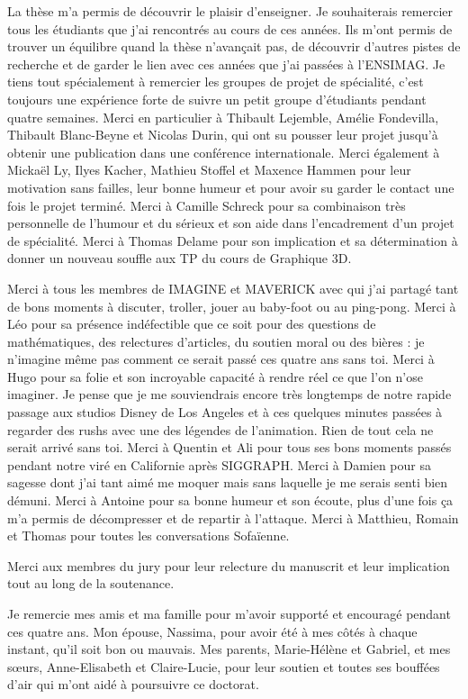 La thèse m'a permis de découvrir le plaisir d'enseigner. Je souhaiterais remercier tous les étudiants que j'ai rencontrés au cours de ces années.
Ils m'ont permis de trouver un équilibre quand la thèse n’avançait pas, de découvrir d'autres pistes de recherche et de garder le lien avec ces années que j'ai passées à l'ENSIMAG. Je tiens tout spécialement à remercier les groupes de projet de spécialité, c'est toujours une expérience forte de suivre un petit groupe d'étudiants pendant quatre semaines. Merci en particulier à Thibault Lejemble, Amélie Fondevilla, Thibault Blanc-Beyne et Nicolas Durin, qui ont su pousser leur projet jusqu'à obtenir une publication dans une conférence internationale. Merci également à Mickaël Ly, Ilyes Kacher, Mathieu Stoffel et Maxence Hammen pour leur motivation sans failles, leur bonne humeur et pour avoir su garder le contact une fois le projet terminé. Merci à Camille Schreck pour sa combinaison très personnelle de l'humour et du sérieux et son aide dans l'encadrement d'un projet de spécialité. Merci à Thomas Delame pour son implication et sa détermination à donner un nouveau souffle aux TP du cours de Graphique 3D.


Merci à tous les membres de IMAGINE et MAVERICK avec qui j'ai partagé tant de bons moments à discuter, troller, jouer au baby-foot ou au ping-pong.
Merci à Léo pour sa présence indéfectible que ce soit pour des questions de mathématiques, des relectures d'articles, du soutien moral ou des bières : je n'imagine même pas comment ce serait passé ces quatre ans sans toi.
Merci à Hugo pour sa folie et son incroyable capacité à rendre réel ce que l'on n'ose imaginer. Je pense que je me souviendrais encore très longtemps de notre rapide passage aux studios Disney de Los Angeles et à ces quelques minutes passées à regarder des rushs avec une des légendes de l'animation. Rien de tout cela ne serait arrivé sans toi.
Merci à Quentin et Ali pour tous ses bons moments passés pendant notre viré en Californie après SIGGRAPH.
Merci à Damien pour sa sagesse dont j'ai tant aimé me moquer mais sans laquelle je me serais senti bien démuni.
Merci à Antoine pour sa bonne humeur et son écoute, plus d'une fois ça m'a permis de décompresser et de repartir à l'attaque.
Merci à Matthieu, Romain et Thomas pour toutes les conversations Sofaïenne.

Merci aux membres du jury pour leur relecture du manuscrit et leur implication tout au long de la soutenance.

Je remercie mes amis et ma famille pour m'avoir supporté et encouragé pendant ces quatre ans.
Mon épouse, Nassima, pour avoir été à mes côtés à chaque instant, qu'il soit bon ou mauvais.
Mes parents, Marie-Hélène et Gabriel, et mes sœurs, Anne-Elisabeth et Claire-Lucie, pour leur soutien et toutes ses bouffées d'air qui m'ont aidé à poursuivre ce doctorat.
